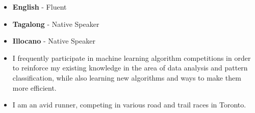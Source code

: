 %
%
%

\twocolumnsection
{
\vspace{1em}
\begin{itemize}
	\item \textbf{English} - Fluent
	\item \textbf{Tagalong} - Native Speaker
	\item \textbf{Illocano} - Native Speaker
\end{itemize}}
{
\vspace{1em}
\begin{itemize}
	\item I frequently participate in machine learning algorithm competitions in order to reinforce my existing knowledge in the area of data analysis and pattern classification, while also learning new algorithms and ways to make them more efficient.
	\item I am an avid runner, competing in various road and trail races in Toronto.                    
\end{itemize}
}
